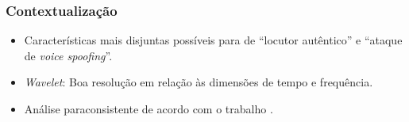 \begin{frame}
	\frametitle{Contextualização}
	\begin{itemize}
		\item Características mais disjuntas possíveis para de ``locutor autêntico'' e ``ataque de \textit{voice spoofing}''.
		\item \textit{Wavelet}: Boa resolução em relação às dimensões de tempo e frequência.
		\item Análise paraconsistente de acordo com o trabalho \cite{8588433}.
	\end{itemize}
\end{frame}